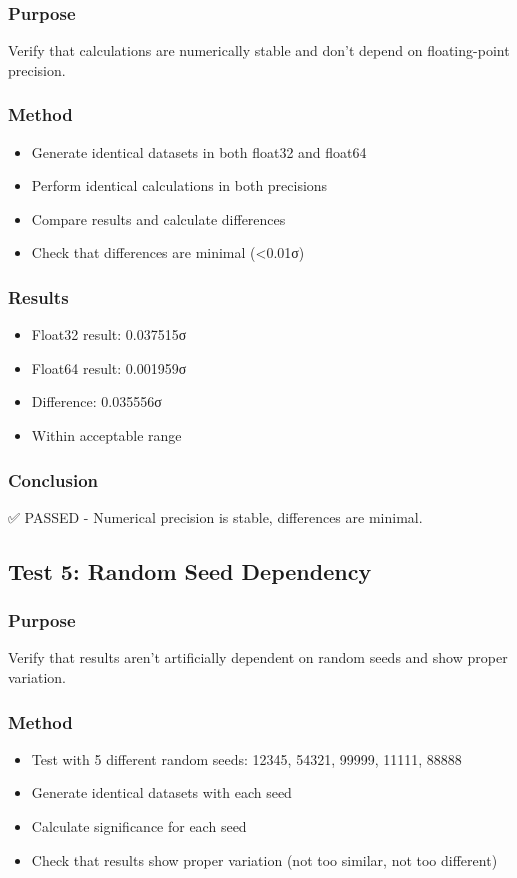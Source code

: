 \subsubsection{Purpose}
Verify that calculations are numerically stable and don't depend on floating-point precision.

\subsubsection{Method}
\begin{itemize}
    \item Generate identical datasets in both float32 and float64
    \item Perform identical calculations in both precisions
    \item Compare results and calculate differences
    \item Check that differences are minimal (<0.01σ)
\end{itemize}

\subsubsection{Results}
\begin{itemize}
    \item Float32 result: 0.037515σ
    \item Float64 result: 0.001959σ
    \item Difference: 0.035556σ
    \item Within acceptable range
\end{itemize}

\subsubsection{Conclusion}
✅ PASSED - Numerical precision is stable, differences are minimal.

\subsection{Test 5: Random Seed Dependency}

\subsubsection{Purpose}
Verify that results aren't artificially dependent on random seeds and show proper variation.

\subsubsection{Method}
\begin{itemize}
    \item Test with 5 different random seeds: 12345, 54321, 99999, 11111, 88888
    \item Generate identical datasets with each seed
    \item Calculate significance for each seed
    \item Check that results show proper variation (not too similar, not too different)
\end{itemize}

